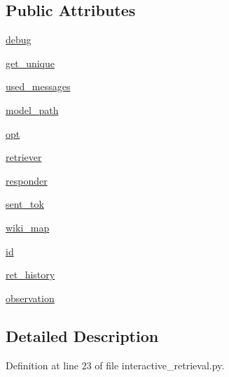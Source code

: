 \subsection*{Public Attributes}
\begin{DoxyCompactItemize}
\item 
\hyperlink{classinteractive__retrieval_1_1InteractiveRetrievalAgent_a42475fe95013b529e6bfd98833930ccc}{debug}
\item 
\hyperlink{classinteractive__retrieval_1_1InteractiveRetrievalAgent_aac72b58ddfd349c3c027d01406af4c29}{get\+\_\+unique}
\item 
\hyperlink{classinteractive__retrieval_1_1InteractiveRetrievalAgent_ae72aa4004665f34696ba66765d369fcd}{used\+\_\+messages}
\item 
\hyperlink{classinteractive__retrieval_1_1InteractiveRetrievalAgent_a957e9be219bc0c8c2f04bf21deabf06f}{model\+\_\+path}
\item 
\hyperlink{classinteractive__retrieval_1_1InteractiveRetrievalAgent_a223bbe2d336caaeec4a45acb1e9f6ecd}{opt}
\item 
\hyperlink{classinteractive__retrieval_1_1InteractiveRetrievalAgent_abcebf849a73120e94a1848def5d2b70a}{retriever}
\item 
\hyperlink{classinteractive__retrieval_1_1InteractiveRetrievalAgent_ad86a617fdd066c0259091c996b1055e3}{responder}
\item 
\hyperlink{classinteractive__retrieval_1_1InteractiveRetrievalAgent_ad5589ceb946df4efce9ef934973022e7}{sent\+\_\+tok}
\item 
\hyperlink{classinteractive__retrieval_1_1InteractiveRetrievalAgent_ab8d026df807beebb656c537e6190e085}{wiki\+\_\+map}
\item 
\hyperlink{classinteractive__retrieval_1_1InteractiveRetrievalAgent_a528df05d1b8f7b7900261c23f4369b11}{id}
\item 
\hyperlink{classinteractive__retrieval_1_1InteractiveRetrievalAgent_a44261e1b26c611d0679ae8eea1b5dc60}{ret\+\_\+history}
\item 
\hyperlink{classinteractive__retrieval_1_1InteractiveRetrievalAgent_af1452e6e3b61f2a081548d7b939df7a7}{observation}
\end{DoxyCompactItemize}


\subsection{Detailed Description}


Definition at line 23 of file interactive\+\_\+retrieval.\+py.



